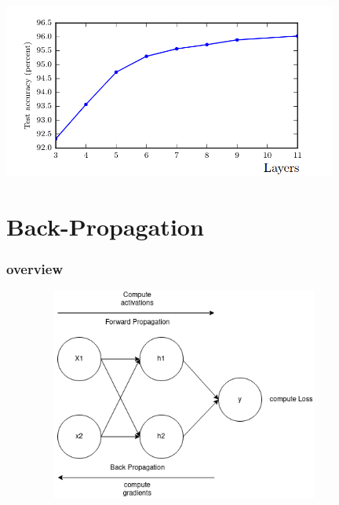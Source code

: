 \documentclass{beamer}
\begin{document}
\begin{frame}
	\center 
	\includegraphics[width = 110mm , height= 60 mm]{depth_accuracy.png}
	
\end{frame}

\section{Back-Propagation}
\begin{frame}
	\frametitle{overview}
	\center
	\includegraphics[width = 120mm , height = 70mm]{back_prop_graph.png}	
\end{frame}
\end{document}
